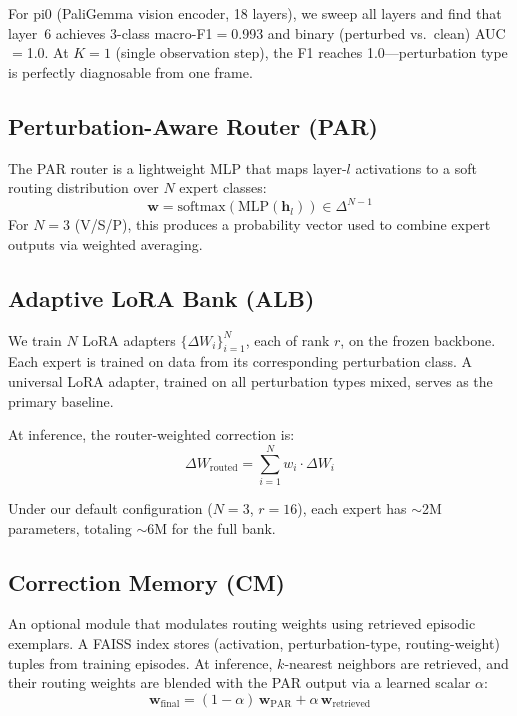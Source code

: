 \documentclass[letterpaper]{article}
\begin{document}
For pi0 (PaliGemma vision encoder, 18 layers), we sweep all layers and find that layer~6 achieves 3-class macro-F1$=$0.993 and binary (perturbed vs.\ clean) AUC$=$1.0.
At $K{=}1$ (single observation step), the F1 reaches 1.0---perturbation type is perfectly diagnosable from one frame.

\subsection{Perturbation-Aware Router (PAR)}
\label{sec:par}

The PAR router is a lightweight MLP that maps layer-$l$ activations to a soft routing distribution over $N$ expert classes:
\begin{equation}
    \mathbf{w} = \text{softmax}(\text{MLP}(\mathbf{h}_l)) \in \Delta^{N-1}
\end{equation}
For $N{=}3$ (V/S/P), this produces a probability vector used to combine expert outputs via weighted averaging.

\subsection{Adaptive LoRA Bank (ALB)}
\label{sec:alb}

We train $N$ LoRA adapters $\{\Delta W_i\}_{i=1}^N$, each of rank $r$, on the frozen backbone.
Each expert is trained on data from its corresponding perturbation class.
A universal LoRA adapter, trained on all perturbation types mixed, serves as the primary baseline.

At inference, the router-weighted correction is:
\begin{equation}
    \Delta W_{\text{routed}} = \sum_{i=1}^{N} w_i \cdot \Delta W_i
\end{equation}

Under our default configuration ($N{=}3$, $r{=}16$), each expert has $\sim$2M parameters, totaling $\sim$6M for the full bank.

\subsection{Correction Memory (CM)}
\label{sec:cm}

An optional module that modulates routing weights using retrieved episodic exemplars.
A FAISS index stores (activation, perturbation-type, routing-weight) tuples from training episodes.
At inference, $k$-nearest neighbors are retrieved, and their routing weights are blended with the PAR output via a learned scalar $\alpha$:
\begin{equation}
    \mathbf{w}_{\text{final}} = (1-\alpha)\,\mathbf{w}_{\text{PAR}} + \alpha\,\mathbf{w}_{\text{retrieved}}
\end{equation}
\end{document}
